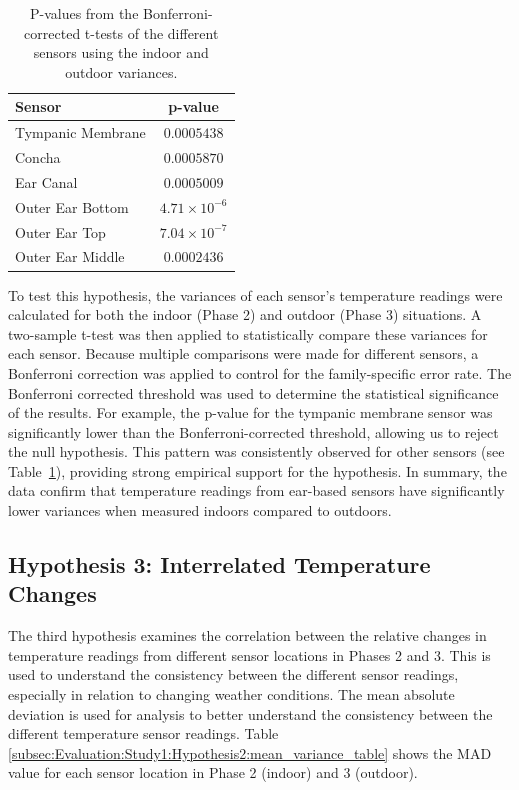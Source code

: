 \begin{table}[h]
\centering
\begin{tabularx}{0.6\textwidth}{|X|c|}
\hline
\textbf{Sensor} & \textbf{p-value} \\
\hline
Tympanic Membrane & \(0.0005438\) \\
Concha & \(0.0005870\) \\
Ear Canal & \(0.0005009\) \\
Outer Ear Bottom & \(4.71 \times 10^{-6}\) \\
Outer Ear Top & \(7.04 \times 10^{-7}\) \\
Outer Ear Middle & \(0.0002436\) \\
\hline
\end{tabularx}
\caption{P-values from the Bonferroni-corrected t-tests of the different sensors using the indoor and outdoor variances.}
\label{subsec:Evaluation:Study1:Hypothesis2:pvalues}
\end{table}

To test this hypothesis, the variances of each sensor's temperature readings were calculated for both the indoor (Phase 2) and outdoor (Phase 3) situations.
A two-sample t-test was then applied to statistically compare these variances for each sensor.
Because multiple comparisons were made for different sensors, a Bonferroni correction was applied to control for the family-specific error rate.
The Bonferroni corrected threshold was used to determine the statistical significance of the results.
For example, the p-value for the tympanic membrane sensor was significantly lower than the Bonferroni-corrected threshold, allowing us to reject the null hypothesis.
This pattern was consistently observed for other sensors (see Table~\ref{subsec:Evaluation:Study1:Hypothesis2:pvalues}), providing strong empirical support for the hypothesis.
In summary, the data confirm that temperature readings from ear-based sensors have significantly lower variances when measured indoors compared to outdoors.

\subsection{Hypothesis 3: Interrelated Temperature Changes}
\label{subsec:Evaluation:Study1:Hypothesis3}
The third hypothesis examines the correlation between the relative changes in temperature readings from different sensor locations in Phases 2 and 3.
This is used to understand the consistency between the different sensor readings, especially in relation to changing weather conditions.
The mean absolute deviation is used for analysis to better understand the consistency between the different temperature sensor readings. 
Table \ref{subsec:Evaluation:Study1:Hypothesis2:mean_variance_table} shows the MAD value for each sensor location in Phase 2 (indoor) and 3 (outdoor).

